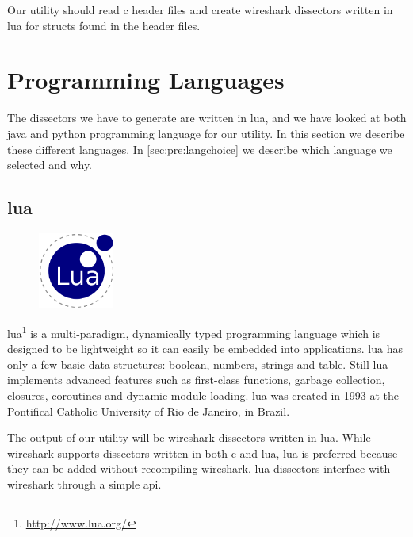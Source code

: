 Our \gls{utility} should read \Gls{c} \gls{header} files and create \Gls{wireshark} \glspl{dissector} written
in \Gls{lua} for \glspl{struct} found in the \gls{header} files.


\section{Programming Languages}
\label{sec:pre:langs}
The \glspl{dissector} we have to generate are written in \Gls{lua}, and we have looked at
both \Gls{java} and \Gls{python} programming language for our \gls{utility}. In this section we
describe these different languages. In \autoref{sec:pre:langchoice} we describe
which language we selected and why.

\subsection{\Gls{lua}}
\begin{figure}
	\vspace{-10pt}
	\includegraphics[width=2.5cm]{./planning/img/lua_logo}
	\vspace{-20pt}
\end{figure}
\Gls{lua}\footnote{\url{http://www.lua.org/}} is a multi-paradigm, dynamically typed
programming language which is designed to be lightweight so it can easily be
embedded into applications. \Gls{lua} has only a few basic data structures: boolean,
numbers, strings and table. Still \Gls{lua} implements advanced features such as
first-class functions, garbage collection, closures, coroutines and dynamic
module loading. \Gls{lua} was created in 1993 at the Pontifical Catholic University
of Rio de Janeiro, in Brazil.

The output of our \gls{utility} will be \Gls{wireshark} \glspl{dissector} written in \Gls{lua}. While
\Gls{wireshark} supports \glspl{dissector} written in both \Gls{c} and \Gls{lua}, \Gls{lua} is preferred
because they can be added without recompiling \Gls{wireshark}. \Gls{lua} \glspl{dissector}
interface with \Gls{wireshark} through a simple \Gls{api}.

